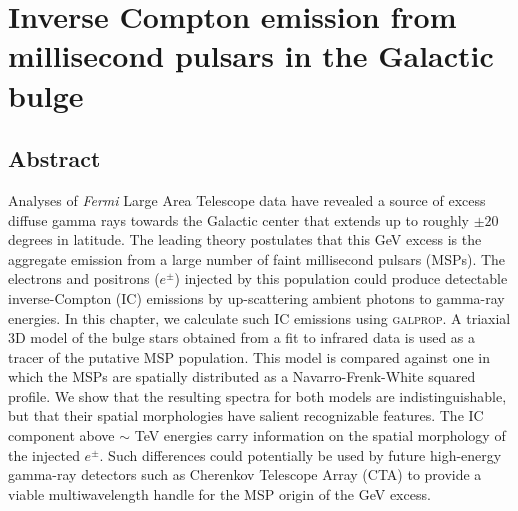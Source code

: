 \documentclass[doublespace,nopageskip]{VTthesis}
\begin{document}


\chapter{Inverse Compton emission from millisecond pulsars in the Galactic bulge} \label{ch:IC_MSPs}

\section{Abstract}

Analyses of \textit{Fermi} Large Area Telescope data have revealed a source of excess diffuse gamma rays towards the Galactic center that extends up to roughly $\pm 20$ degrees in latitude. The leading theory postulates that this GeV excess is the aggregate emission from a large number of faint millisecond pulsars (MSPs). The electrons and positrons ($e^{\pm}$) injected by this population could produce detectable inverse-Compton (IC) emissions by up-scattering ambient photons to gamma-ray energies. In this chapter, we calculate such IC emissions using \textsc{galprop}. A triaxial 3D model of the bulge stars obtained from a fit to infrared data is used as a tracer of the putative MSP population. This model is compared against one in which the MSPs are spatially distributed as a Navarro-Frenk-White squared profile. We show that the resulting spectra for both models are indistinguishable, but that their spatial morphologies have salient recognizable features. The IC component above $\sim $ TeV energies carry information on the spatial morphology of the injected $e^\pm$. Such differences could potentially be used by future high-energy gamma-ray detectors such as Cherenkov Telescope Array (CTA) to provide a viable multiwavelength handle for the MSP origin of the GeV excess.

\end{document}
